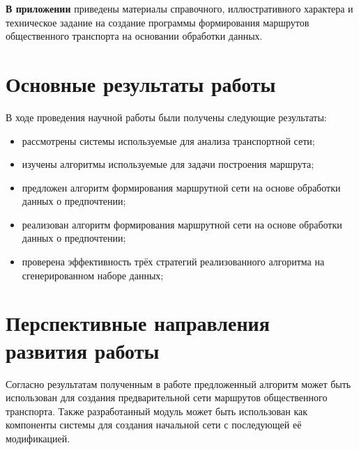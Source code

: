 \textbf{В приложении} приведены материалы справочного, иллюстративного характера и техническое задание на 
создание программы формирования маршрутов общественного транспорта на основании обработки данных.

\section{Основные результаты работы}
В ходе проведения научной работы были получены следующие результаты:
\begin{itemize}
    \item рассмотрены системы используемые для анализа транспортной сети;
    \item изучены алгоритмы используемые для задачи построения маршрута;
    \item предложен алгоритм формирования маршрутной сети на основе обработки данных о предпочтении;
    \item реализован алгоритм формирования маршрутной сети на основе обработки данных о предпочтении;
    \item проверена эффективность трёх стратегий реализованного алгоритма на сгенерированном наборе данных;
\end{itemize}

\section{Перспективные направления развития работы}
Согласно результатам полученным в работе предложенный алгоритм может быть использован для создания 
предварительной сети маршрутов общественного транспорта. Также разработанный модуль может быть использован 
как компоненты системы для создания начальной сети с последующей её модификацией.

